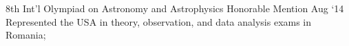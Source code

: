 \experience
    {8th Int'l Olympiad on Astronomy and Astrophysics}
    {Honorable Mention}
    {Aug `14}
    {
        Represented the USA in theory, observation, and data analysis exams in Romania;
    }
